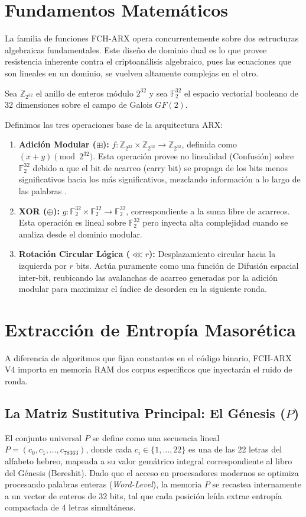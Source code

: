 \documentclass[10pt,journal,compsoc]{IEEEtran}
\begin{document}
\section{Fundamentos Matemáticos}

La familia de funciones FCH-ARX opera concurrentemente sobre dos estructuras algebraicas fundamentales. Este diseño de dominio dual es lo que provee resistencia inherente contra el criptoanálisis algebraico, pues las ecuaciones que son lineales en un dominio, se vuelven altamente complejas en el otro.

Sea $\mathbb{Z}_{2^{32}}$ el anillo de enteros módulo $2^{32}$ y sea $\mathbb{F}_2^{32}$ el espacio vectorial booleano de 32 dimensiones sobre el campo de Galois $GF(2)$. 

Definimos las tres operaciones base de la arquitectura ARX:
\begin{enumerate}
    \item \textbf{Adición Modular ($\boxplus$):} $f: \mathbb{Z}_{2^{32}} \times \mathbb{Z}_{2^{32}} \to \mathbb{Z}_{2^{32}}$, definida como $(x + y) \pmod{2^{32}}$. Esta operación provee no linealidad (Confusión) sobre $\mathbb{F}_2^{32}$ debido a que el bit de acarreo (carry bit) se propaga de los bits menos significativos hacia los más significativos, mezclando información a lo largo de las palabras \cite{mouha2011differential}.
    \item \textbf{XOR ($\oplus$):} $g: \mathbb{F}_2^{32} \times \mathbb{F}_2^{32} \to \mathbb{F}_2^{32}$, correspondiente a la suma libre de acarreos. Esta operación es lineal sobre $\mathbb{F}_2^{32}$ pero inyecta alta complejidad cuando se analiza desde el dominio modular.
    \item \textbf{Rotación Circular Lógica ($\lll r$):} Desplazamiento circular hacia la izquierda por $r$ bits. Actúa puramente como una función de Difusión espacial inter-bit, reubicando las avalanchas de acarreo generadas por la adición modular para maximizar el índice de desorden en la siguiente ronda.
\end{enumerate}

\section{Extracción de Entropía Masorética}

A diferencia de algoritmos que fijan constantes en el código binario, FCH-ARX V4 importa en memoria RAM dos corpus específicos que inyectarán el ruido de ronda.

\subsection{La Matriz Sustitutiva Principal: El Génesis ($P$)}
El conjunto universal $P$ se define como una secuencia lineal $P = (c_0, c_1, \dots, c_{78363})$, donde cada $c_i \in \{1, \dots, 22\}$ es una de las 22 letras del alfabeto hebreo, mapeada a su valor gemátrico integral correspondiente al libro del Génesis (Bereshit). 
Dado que el acceso en procesadores modernos se optimiza procesando palabras enteras (\textit{Word-Level}), la memoria $P$ se recastea internamente a un vector de enteros de 32 bits, tal que cada posición leída extrae entropía compactada de 4 letras simultáneas.
\end{document}
